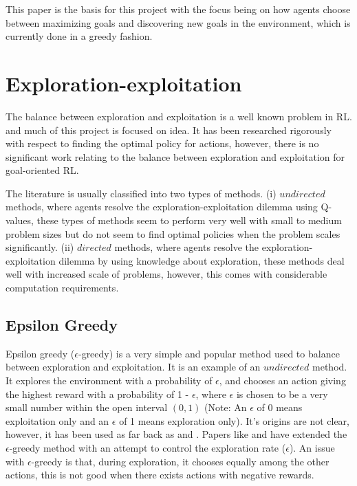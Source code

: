 \documentclass[a4paper,twoside,12pt]{report}
\begin{document}
This paper is the basis for this project with the focus being on how agents choose between maximizing goals and 
discovering new goals in the environment, which is currently done in a greedy fashion.

\section{Exploration-exploitation} \label{review:exp}
The balance between exploration and exploitation is a well known problem in RL. and much of this project is focused on 
idea. It has been researched rigorously with respect to finding the optimal policy for actions, however, there is no 
significant work relating to the balance between exploration and exploitation for goal-oriented RL.

The literature is usually classified into two types of methods. (i) $undirected$ methods, where agents resolve the 
exploration-exploitation dilemma using Q-values, these types of methods seem to perform very well with small to medium 
problem sizes but do not seem to find optimal policies when the problem scales significantly. (ii) $directed$ methods, 
where agents resolve the exploration-exploitation dilemma by using knowledge about exploration, these methods deal well 
with increased scale of problems, however, this comes with considerable computation requirements.

\subsection{Epsilon Greedy}
Epsilon greedy ($\epsilon$-greedy) is a very simple and popular method used to balance between exploration and 
exploitation. It is an example of an $undirected$ method. It explores the environment with a probability of $\epsilon$,
and chooses an action giving the highest reward with a probability of 1 - $\epsilon$, where $\epsilon$ is chosen to be a 
very small number within the open interval $(0, 1)$ (Note: An $\epsilon$ of 0 means exploitation only and an $\epsilon$ 
of 1 means exploration only). It's origins are not clear, however, it has been used as far back as 
\citet*{watkins1989learning} and \citet*{sutton1998introduction}. Papers like \citet*{tokic2011value} and 
\citet*{dos2017adaptive} have extended the $\epsilon$-greedy method with an attempt to control the exploration rate 
($\epsilon$). An issue with $\epsilon$-greedy is that, during exploration, it chooses equally among the other actions, 
this is not good when there exists actions with negative rewards.
\end{document}

